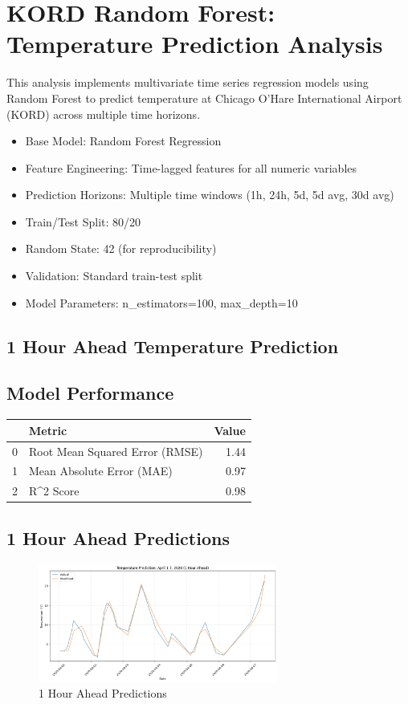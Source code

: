 \section{KORD Random Forest: Temperature Prediction Analysis}
This analysis implements multivariate time series regression models using Random Forest to predict temperature at Chicago O'Hare International Airport (KORD) across multiple time horizons.\
\begin{itemize}
  \item Base Model: Random Forest Regression
  \item Feature Engineering: Time-lagged features for all numeric variables
  \item Prediction Horizons: Multiple time windows (1h, 24h, 5d, 5d avg, 30d avg)
  \item Train/Test Split: 80/20
  \item Random State: 42 (for reproducibility)
  \item Validation: Standard train-test split
  \item Model Parameters: n_estimators=100, max_depth=10
\end{itemize}

\subsection{1 Hour Ahead Temperature Prediction}
\subsection{Model Performance}
\begin{tabular}{llr}
\toprule
 & Metric & Value \\
\midrule
0 & Root Mean Squared Error (RMSE) & 1.44 \\
1 & Mean Absolute Error (MAE) & 0.97 \\
2 & R^2 Score & 0.98 \\
\bottomrule
\end{tabular}

\subsection{1 Hour Ahead Predictions}
\begin{figure}[htbp]
\centering
\includegraphics[width=0.7\textwidth]{7-0-random_forest_temp_prediction_results.png}
\caption{1 Hour Ahead Predictions}
\label{fig:1_hour_ahead_pred}
\end{figure}

